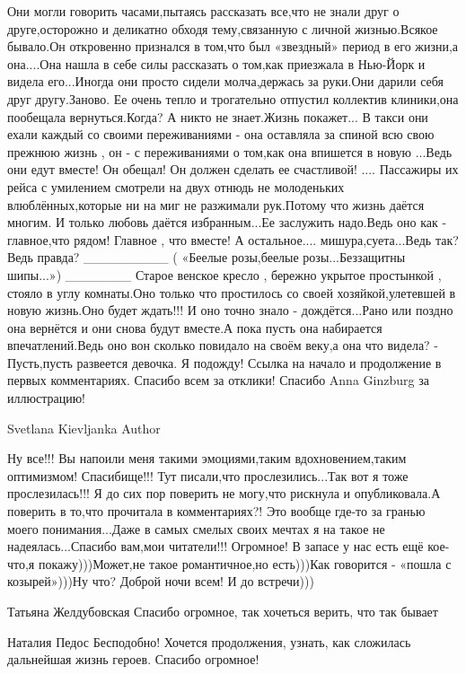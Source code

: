 Они могли говорить часами,пытаясь рассказать все,что не знали друг о друге,осторожно и деликатно обходя тему,связанную с личной жизнью.Всякое бывало.Он откровенно признался в том,что был «звездный» период в его жизни,а она....Она нашла в себе силы рассказать о том,как приезжала в Нью-Йорк и видела его...Иногда они просто сидели молча,держась за руки.Они дарили себя друг другу.Заново.
Ее очень тепло и трогательно отпустил коллектив клиники,она пообещала вернуться.Когда? А никто не знает.Жизнь покажет...
В такси они ехали каждый со своими переживаниями - она оставляла за спиной всю свою прежнюю жизнь , он - с переживаниями о том,как она впишется в новую ...Ведь они едут вместе! Он обещал! Он должен сделать ее счастливой! ....
Пассажиры их рейса с умилением смотрели на двух отнюдь не молоденьких влюблённых,которые ни на миг не разжимали рук.Потому что жизнь даётся многим. И только любовь даётся избранным...Ее заслужить надо.Ведь оно как - главное,что рядом! Главное , что  вместе! А остальное.... мишура,суета...Ведь так? Ведь правда? 
_________
( «Беелые розы,беелые розы...Беззащитны шипы...»)
_______
Старое венское кресло , бережно укрытое простынкой , стояло в углу комнаты.Оно только что простилось со своей хозяйкой,улетевшей в новую жизнь.Оно будет ждать!!! И оно точно знало - дождётся...Рано или поздно она вернётся и они снова будут вместе.А пока пусть она набирается впечатлений.Ведь оно вон сколько повидало на своём веку,а она что видела? 
     - Пусть,пусть развеется         девочка. Я подожду! 
Ссылка на начало и продолжение в первых комментариях.
Спасибо всем за отклики! 
Спасибо Anna Ginzburg за иллюстрацию!

Svetlana Kievljanka
Author

Ну все!!! Вы напоили меня такими эмоциями,таким вдохновением,таким оптимизмом! Спасибище!!! Тут писали,что прослезились...Так вот я тоже прослезилась!!! Я до сих пор поверить не могу,что рискнула и опубликовала.А поверить в то,что прочитала в комментариях?! Это вообще где-то за гранью моего понимания...Даже в самых смелых своих мечтах я на такое не надеялась...Спасибо вам,мои читатели!!! Огромное! В запасе у нас есть ещё кое-что,я покажу)))Может,не такое романтичное,но есть)))Как говорится - «пошла с козырей»)))Ну что? Доброй ночи всем! И до встречи)))

Татьяна Желдубовская
Спасибо огромное, так хочеться верить, что так бывает

Наталия Педос
Бесподобно! Хочется продолжения, узнать, как сложилась дальнейшая жизнь героев.
Спасибо огромное!

